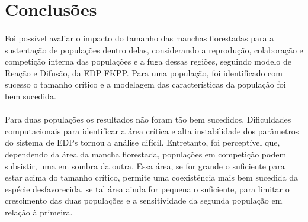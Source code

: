 \documentclass{article}
\begin{document}
	\section{Conclusões}
	
	\paragraph{}
	Foi possível avaliar o impacto do tamanho das manchas florestadas para a sustentação de populações dentro delas, considerando a reprodução, colaboração e competição interna das populações e a fuga dessas regiões, seguindo modelo de Reação e Difusão, da EDP FKPP. Para uma população, foi identificado com sucesso o tamanho crítico e a modelagem das características da população foi bem sucedida. 
	
	\paragraph{}
	Para duas populações os resultados não foram tão bem sucedidos. Dificuldades computacionais para identificar a área crítica e alta instabilidade dos parâmetros do sistema de EDPs tornou a análise difícil. Entretanto, foi perceptível que, dependendo da área da mancha florestada, populações em competição podem subsistir, uma em sombra da outra. Essa área, se for grande o suficiente para estar acima do tamanho crítico, permite uma coexistência mais bem sucedida da espécie desfavorecida, se tal área ainda for pequena o suficiente, para limitar o crescimento das duas populações e a sensitividade da segunda população em relação à primeira.
\end{document}
